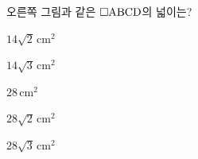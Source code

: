 \noindent\begin{minipage}[t]{0.58\linewidth}\vspace{0pt}\raggedright 오른쪽 그림과 같은 $\square\mathrm{ABCD}$의 넓이는?\end{minipage}\hfill\begin{minipage}[t]{0.4\linewidth}\vspace{0pt}\centering \resizebox{\ifdim\width>\linewidth\linewidth\else\width\fi}{!}{}\end{minipage}\par
\begin{choicesii}{\rule[-3ex]{0pt}{8ex}$14\sqrt{2}\,\mathrm{cm}^2$}{\rule[-3ex]{0pt}{8ex}$14\sqrt{3}\,\mathrm{cm}^2$}{\rule[-3ex]{0pt}{8ex}$28\,\mathrm{cm}^2$}{\rule[-3ex]{0pt}{8ex}$28\sqrt{2}\,\mathrm{cm}^2$}{\rule[-3ex]{0pt}{8ex}$28\sqrt{3}\,\mathrm{cm}^2$}\end{choicesii}
